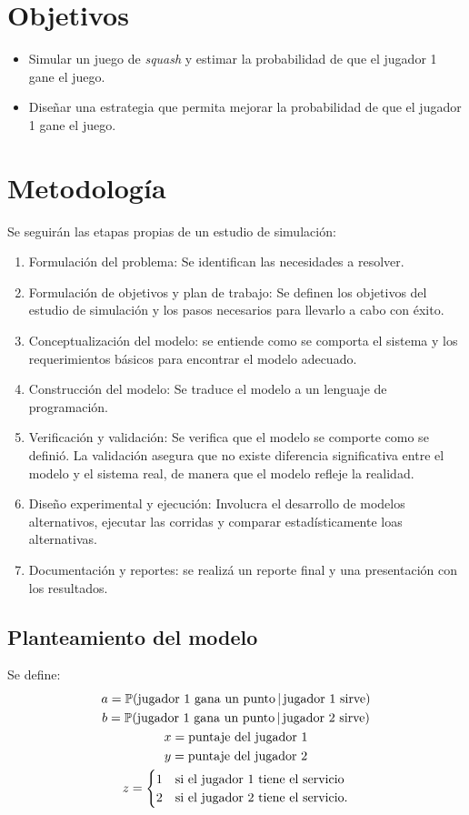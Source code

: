\documentclass[11pt,letterpaper]{scrartcl}
\begin{document}
	\section{Objetivos}
	\begin{itemize}
		\item Simular un juego de \textit{squash} y estimar la probabilidad de que el jugador 1 gane el juego.
		\item Diseñar una estrategia que permita mejorar la probabilidad de que el jugador 1 gane el juego.
	\end{itemize}
	
	
	\section{Metodología}
	Se seguirán las etapas propias de un estudio de simulación:
	\begin{enumerate}
		\item Formulación del problema: Se identifican las necesidades a resolver.
		\item Formulación de objetivos y plan de trabajo: Se definen los objetivos del estudio de simulación y los pasos necesarios para llevarlo a cabo con éxito.
		\item Conceptualización del modelo: se entiende como se comporta el sistema y los requerimientos básicos para encontrar el modelo adecuado.
		\item Construcción del modelo: Se traduce el modelo a un lenguaje de programación.
		\item Verificación y validación: Se verifica que el modelo se comporte como se definió. La validación asegura que no existe diferencia significativa entre el modelo y el sistema real, de manera que el modelo refleje la realidad.
		\item Diseño experimental y ejecución: Involucra el desarrollo de modelos alternativos, ejecutar las corridas y comparar estadísticamente loas alternativas.
		\item Documentación y reportes: se realizá un reporte final y una presentación con los resultados.
	\end{enumerate}
	
		\subsection{Planteamiento del modelo}
		Se define:
		\begin{gather}
			a = \mathbb{P}(\text{jugador 1 gana un punto}\,|\,\text{jugador 1 sirve})\\
			b = \mathbb{P}(\text{jugador 1 gana un punto}\,|\,\text{jugador 2 sirve})\\
			x = \text{puntaje del jugador 1}\\
			y = \text{puntaje del jugador 2}\\
			z = \begin{cases}
				1 & \text{si el jugador 1 tiene el servicio}\\
				2 & \text{si el jugador 2 tiene el servicio\text{.}}
			\end{cases} 
		\end{gather}
\end{document}
